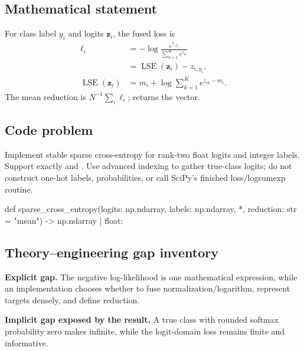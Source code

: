 
        \subsection{Mathematical statement}


For class label $y_i$ and logits $\bm z_i$, the fused loss is
\[
\begin{aligned}
\ell_i
  &=-\log\frac{e^{z_{i,y_i}}}{\sum_{k=1}^{K}e^{z_{ik}}}\\
  &=\operatorname{LSE}(\bm z_i)-z_{i,y_i},\\
\operatorname{LSE}(\bm z_i)
  &=m_i+\log\sum_{k=1}^{K}e^{z_{ik}-m_i}.
\end{aligned}
\]
The mean reduction is $N^{-1}\sum_i\ell_i$;  returns the vector.


        \subsection{Code problem}


Implement stable sparse cross-entropy for rank-two float logits and integer
labels.  Support exactly  and .  Use
advanced indexing to gather true-class logits; do not construct one-hot labels,
probabilities, or call SciPy's finished loss/logsumexp routine.


        \begin{contractbox}
        \begin{Code}
        def sparse_cross_entropy(logits: np.ndarray, labels: np.ndarray, *, reduction: str = "mean") -> np.ndarray | float:
        \end{Code}
        \end{contractbox}

        \subsection{Theory--engineering gap inventory}

        \begin{gapbox}
        \textbf{Explicit gap.} The negative log-likelihood is one mathematical expression, while an implementation chooses whether to fuse normalization/logarithm, represent targets densely, and define reduction.

        \textbf{Implicit gap exposed by the result.} A true class with rounded softmax probability zero makes  infinite, while the logit-domain loss remains finite and informative.
        \end{gapbox}

